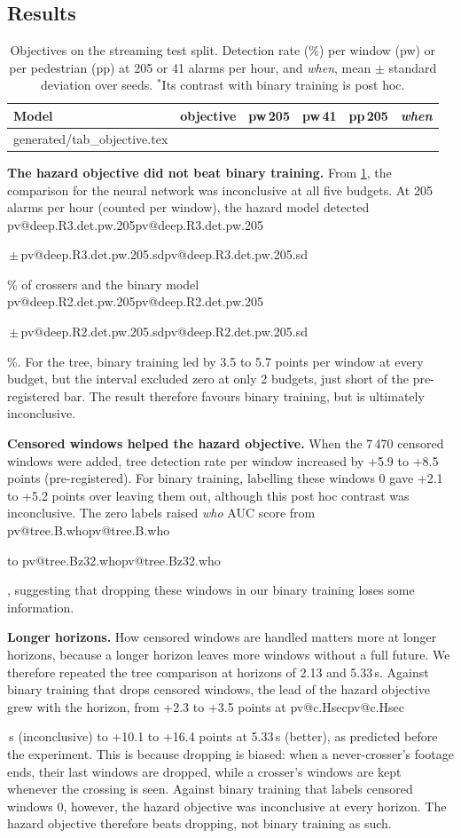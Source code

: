 \documentclass[10pt,a4paper,twocolumn]{article}
\makeatletter
\newcommand{\tabrows}[1]{\@@input generated/tab_#1.tex }
\newcommand{\V}[1]{\ifcsname pv@#1\endcsname\csname pv@#1\endcsname\else
  \PackageError{numbers}{Unknown number key: #1}{Run figures/make_tables.py}\fi}
\makeatother
\begin{document}
\subsection{Results}
\label{sec:objresults}
\begin{table}[t]
  \centering
  \caption{Objectives on the streaming test split. Detection rate (\%)
  per window (pw) or per pedestrian (pp) at 205 or 41 alarms per hour, and
  \emph{when}, mean $\pm$ standard deviation over seeds. $^\ast$Its contrast
  with binary training is post hoc.}
  \label{tab:objective}
  \setlength{\tabcolsep}{2pt}
  \scriptsize
  \begin{tabular}{ll cccc}
    \toprule
    Model & objective & pw\,205 & pw\,41 & pp\,205 & \emph{when} \\
    \midrule
\tabrows{objective}
    \bottomrule
  \end{tabular}
\end{table}

\textbf{The hazard objective did not beat binary training.} From
\cref{tab:objective}, the comparison for the neural network was inconclusive
at all five budgets. At 205 alarms per hour (counted per window), the hazard
model detected
\V{deep.R3.det.pw.205}\,$\pm$\,\V{deep.R3.det.pw.205.sd}\% of crossers and the
binary model \V{deep.R2.det.pw.205}\,$\pm$\,\V{deep.R2.det.pw.205.sd}\%. For
the tree, binary training led by 3.5 to 5.7 points per window at every
budget, but the interval excluded zero at only 2 budgets, just short of the
pre-registered bar. The result therefore favours binary training, but is
ultimately inconclusive.

\textbf{Censored windows helped the hazard objective.} When the 7\,470
censored windows were added, tree detection rate per window increased by +5.9
to +8.5 points (pre-registered). For binary training, labelling these windows
0 gave +2.1 to +5.2 points over leaving them out, although this post hoc
contrast was inconclusive. The zero labels raised \emph{who} AUC score from
\V{tree.B.who} to \V{tree.Bz32.who}, suggesting that dropping these windows in
our binary training loses some information.

\textbf{Longer horizons.} How censored windows are handled matters more at
longer horizons, because a longer horizon leaves more windows without a full
future. We therefore repeated the tree comparison at horizons of 2.13 and
5.33\,s. Against binary training that drops
censored windows, the lead of the hazard objective grew with the horizon, from
+2.3 to +3.5 points at \V{c.Hsec}\,s (inconclusive) to +10.1 to +16.4 points
at 5.33\,s (better), as predicted before the experiment. This is because
dropping is biased: when a never-crosser's footage ends, their last windows
are dropped, while a crosser's windows are kept whenever the crossing is seen. Against binary training that labels censored windows
0, however, the hazard objective was inconclusive at every horizon. The hazard
objective therefore beats dropping, not binary training as such.
\end{document}
